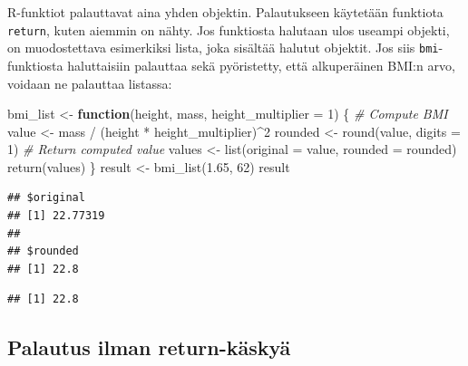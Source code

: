 \documentclass[
]{book}
\newenvironment{Shaded}{\begin{snugshade}}{\end{snugshade}}
\newcommand{\AttributeTok}[1]{\textcolor[rgb]{0.77,0.63,0.00}{#1}}
\newcommand{\CommentTok}[1]{\textcolor[rgb]{0.56,0.35,0.01}{\textit{#1}}}
\newcommand{\ControlFlowTok}[1]{\textcolor[rgb]{0.13,0.29,0.53}{\textbf{#1}}}
\newcommand{\DecValTok}[1]{\textcolor[rgb]{0.00,0.00,0.81}{#1}}
\newcommand{\FloatTok}[1]{\textcolor[rgb]{0.00,0.00,0.81}{#1}}
\newcommand{\FunctionTok}[1]{\textcolor[rgb]{0.00,0.00,0.00}{#1}}
\newcommand{\NormalTok}[1]{#1}
\newcommand{\OtherTok}[1]{\textcolor[rgb]{0.56,0.35,0.01}{#1}}
\newcommand{\SpecialCharTok}[1]{\textcolor[rgb]{0.00,0.00,0.00}{#1}}
\begin{document}
R-funktiot palauttavat aina yhden objektin. Palautukseen käytetään funktiota \texttt{return}, kuten aiemmin on nähty. Jos funktiosta halutaan ulos useampi objekti, on muodostettava esimerkiksi lista, joka sisältää halutut objektit. Jos siis \texttt{bmi}-funktiosta haluttaisiin palauttaa sekä pyöristetty, että alkuperäinen BMI:n arvo, voidaan ne palauttaa listassa:

\begin{Shaded}
\begin{Highlighting}[]
\NormalTok{bmi\_list }\OtherTok{\textless{}{-}} \ControlFlowTok{function}\NormalTok{(height, mass, }\AttributeTok{height\_multiplier =} \DecValTok{1}\NormalTok{) \{}
  \CommentTok{\# Compute BMI}
\NormalTok{  value }\OtherTok{\textless{}{-}}\NormalTok{ mass }\SpecialCharTok{/}\NormalTok{ (height }\SpecialCharTok{*}\NormalTok{ height\_multiplier)}\SpecialCharTok{\^{}}\DecValTok{2}
\NormalTok{  rounded }\OtherTok{\textless{}{-}} \FunctionTok{round}\NormalTok{(value, }\AttributeTok{digits =} \DecValTok{1}\NormalTok{)}
  \CommentTok{\# Return computed value}
\NormalTok{  values }\OtherTok{\textless{}{-}} \FunctionTok{list}\NormalTok{(}\AttributeTok{original =}\NormalTok{ value,}
                 \AttributeTok{rounded =}\NormalTok{ rounded)}
  \FunctionTok{return}\NormalTok{(values)}
\NormalTok{\}}
\NormalTok{result }\OtherTok{\textless{}{-}} \FunctionTok{bmi\_list}\NormalTok{(}\FloatTok{1.65}\NormalTok{, }\DecValTok{62}\NormalTok{)}
\NormalTok{result}
\end{Highlighting}
\end{Shaded}

\begin{verbatim}
## $original
## [1] 22.77319
## 
## $rounded
## [1] 22.8
\end{verbatim}

\begin{Shaded}
\end{Shaded}

\begin{verbatim}
## [1] 22.8
\end{verbatim}

\hypertarget{palautus-ilman-return-kuxe4skyuxe4}{%
\subsection{Palautus ilman return-käskyä}\label{palautus-ilman-return-kuxe4skyuxe4}}
\end{document}
